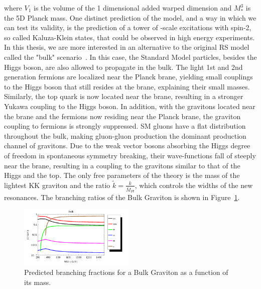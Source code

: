 where $V_1$ is the volume of the 1 dimensional added warped dimension and $M_*^3$ is the 5D Planck mass.
One distinct prediction of the model, and a way in which we can test its validity, is the prediction of a tower of \TeV-scale excitations with spin-2, so called Kaluza-Klein states, that could be observed in high energy experiments. \newline
In this thesis, we are more interested in an alternative to the original RS model called the "bulk" scenario~\cite{PhysRevD.76.036006,Fitzpatrick:2007qr}. In this case, the Standard Model particles, besides the Higgs boson, are also allowed to propagate in the bulk. The light 1st and 2nd generation fermions are localized near the Planck brane, yielding small couplings to the Higgs boson that still resides at the \TeV brane, explaining their small masses. Similarly, the top quark is now located near the \TeV brane, resulting in a stronger Yukawa coupling to the Higgs boson. In addition, with the gravitons located near the \TeV brane and the fermions now residing near the Planck brane, the graviton coupling to fermions is strongly suppressed. SM gluons have a flat distribution throughout the bulk, making gluon-gluon production the dominant production channel of gravitons. Due to the weak vector bosons absorbing the Higgs degree of freedom in spontaneous symmetry breaking, their wave-functions fall of steeply near the \TeV brane, resulting in a coupling to the gravitons similar to that of the Higgs and the top. The only free parameters of the theory is the mass of the lightest KK graviton and the ratio $\tilde{k} = \frac{k}{\bar{M}_{Pl}}$, which controls the widths of the new resonances. The branching ratios of the Bulk Graviton is shown in Figure~\ref{fig:theory:bulk}.
\begin{figure}[h!]
\centering
\includegraphics[width=0.49\textwidth]{figures/theory/BulkGravitonBR_tuomas.png}
\caption{Predicted branching fractions for a Bulk Graviton as a function of its mass.}
\label{fig:theory:bulk}
\end{figure}

